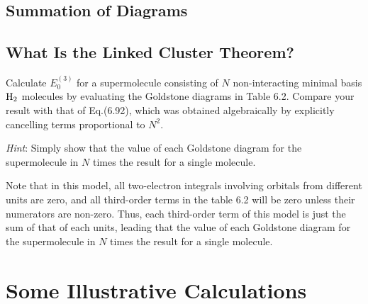 \documentclass[a4paper]{book}
\newcounter{exercise}[chapter]
\newcounter{solution}[chapter]
\begin{document}
	\subsection{Summation of Diagrams}
	
	\subsection{What Is the Linked Cluster Theorem?}
	
	\begin{exercise}
	Calculate $E^{(3)}_0$ for a supermolecule consisting of $N$ non-interacting minimal basis $\ce{H2}$ molecules by evaluating the Goldstone diagrams in Table 6.2. Compare your result with that of Eq.(6.92), which was obtained algebraically by explicitly cancelling terms proportional to $N^2$.
	
	{\it Hint}: Simply show that the value of each Goldstone diagram for the supermolecule in $N$ times the result for a single molecule.
	\end{exercise}
	
	\begin{solution}
	Note that in this model, all two-electron integrals involving orbitals from different units are zero, and all third-order terms in the table 6.2 will be zero unless their numerators are non-zero. Thus, each third-order term of this model is just the sum of that of each units, leading that the value of each Goldstone diagram for the supermolecule in $N$ times the result for a single molecule.
	\end{solution}
	
	\section{Some Illustrative Calculations}
\end{document}
